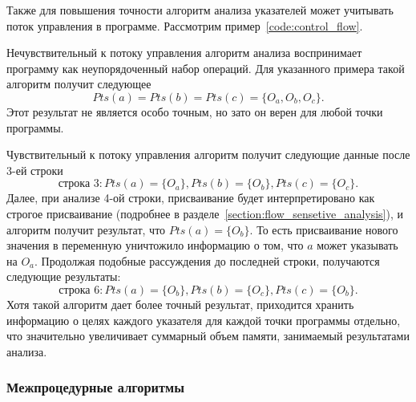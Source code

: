 \documentclass[14pt,titlepage,draft]{extarticle}
\newcommand{\NEW}{\textbf{new}}
\begin{document}
        Также для повышения точности алгоритм анализа указателей может
        учитывать поток управления в программе.
        Рассмотрим пример~\ref{code:control_flow}.

        \label{code:control_flow}

        Нечувствительный к потоку управления алгоритм анализа воспринимает
        программу как неупорядоченный набор операций.
        Для указанного примера такой алгоритм получит следующее
        \[Pts(a) = Pts(b) = Pts(c) = \{O_a, O_b, O_c\}.\]
        Этот результат не является особо точным, но зато он верен
        для любой точки программы.

        Чувствительный к потоку управления алгоритм получит следующие данные
        после 3-ей строки
        \[\textrm{строка 3}:
            Pts(a) = \{O_a\}, Pts(b) = \{O_b\}, Pts(c) = \{O_c\}.\]
        Далее, при анализе 4-ой строки, присваивание будет интерпретировано
        как строгое присваивание (подробнее в
        разделе~\ref{section:flow_sensetive_analysis}), и алгоритм получит
        результат, что $Pts(a) = \{O_b\}$. То есть присваивание нового значения
        в переменную уничтожило информацию о том, что $a$ может указывать на
        $O_a$. Продолжая подобные рассуждения до последней строки, получаются
        следующие результаты:
        \[\textrm{строка 6}:
            Pts(a) = \{O_b\}, Pts(b) = \{O_c\}, Pts(c) = \{O_b\}.\]
        Хотя такой алгоритм дает более точный результат, приходится хранить
        информацию о целях каждого указателя для каждой точки программы
        отдельно, что значительно увеличивает суммарный объем памяти,
        занимаемый результатами анализа.

      \subsubsection{Межпроцедурные алгоритмы}
\end{document}
